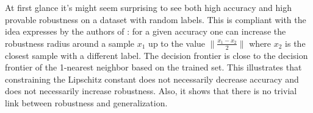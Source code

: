     
    At first glance it's might seem surprising to see both high accuracy and high provable robustness on a dataset with random labels. This is compliant with the idea expresses by the authors of \cite{yang2020closer}: for a given accuracy one can increase the robustness radius around a sample $x_1$ up to the value $\| \frac{x_1 -x_2}{2} \| $ where $x_2$ is the closest sample with a different label. The decision frontier is close to the decision frontier of the 1-nearest neighbor based on the trained set.
    This illustrates that constraining the Lipschitz constant does not necessarily decrease accuracy and does not necessarily increase robustness. Also, it shows that there is no trivial link between robustness and generalization.

